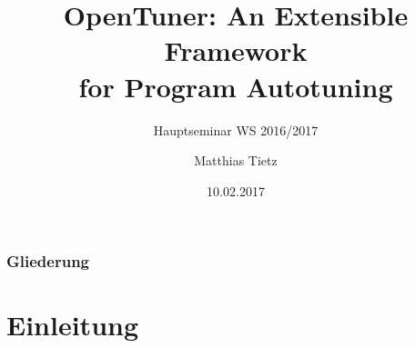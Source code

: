 
\usepackage[utf8]{inputenc}
\usepackage{babel}
\usepackage{floatflt}
\usepackage{float}
\usepackage{graphics}
\usepackage{listings}
\usepackage{color}


%
%

\title{OpenTuner: An Extensible Framework\\for Program Autotuning}
\subtitle{Hauptseminar WS 2016/2017}
\author{Matthias Tietz}

\date{10.02.2017}
\institute[TUC]



    \tucthreeheadlines
    
    \begin{frame}
      \titlepage
    \end{frame}

    \begin{frame}

       \frametitle{Gliederung}
       \tableofcontents

    \end{frame}


    \tuctwoheadlines

    

    \section{Einleitung}


